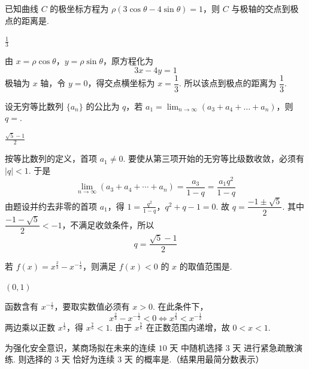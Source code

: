 \begin{problem}
已知曲线 \(C\) 的极坐标方程为 \( \rho(3\cos\theta-4\sin\theta)=1 \)，则 \(C\) 与极轴的交点到极点的距离是\fillinblank{}.
\end{problem}

\begin{answer}
\(\frac{1}{3}\)
\end{answer}

\begin{solution}
由 \(x=\rho\cos\theta\)，\(y=\rho\sin\theta\)，原方程化为
\[
3x-4y=1
\]
极轴为 \(x\) 轴，令 \(y=0\)，得交点横坐标为 \(x=\dfrac13\). 所以该点到极点的距离为 \(\dfrac13\).
\end{solution}

\begin{problem}
设无穷等比数列 \(\{a_{n}\}\) 的公比为 \(q\)，若 \(a_{1} = \displaystyle\lim_{n\to \infty}(a_{3} + a_{4} + \dots + a_{n})\)，则 \(q =\)\fillinblank{}.
\end{problem}

\begin{answer}
\(\frac{\sqrt{5}-1}{2}\)
\end{answer}

\begin{solution}
按等比数列的定义，首项 \(a_1\neq0\). 要使从第三项开始的无穷等比级数收敛，必须有 \(\lvert q\rvert<1\). 于是
\[
\lim_{n\to\infty}(a_3+a_4+\cdots+a_n)
=\frac{a_3}{1-q}=\frac{a_1q^2}{1-q}
\]
由题设并约去非零的首项 \(a_1\)，得
\(1=\frac{q^2}{1-q}\)，\(q^2+q-1=0\).
故 \(q=\dfrac{-1\pm\sqrt5}{2}\). 其中 \(\dfrac{-1-\sqrt5}{2}<-1\)，不满足收敛条件，所以
\[
q=\frac{\sqrt5-1}{2}
\]
\end{solution}

\begin{problem}
若 \( f(x) = x^{\frac{2}{3}} - x^{-\frac{1}{2}} \)，则满足 \( f(x) < 0 \) 的 \( x \) 的取值范围是\fillinblank{}.
\end{problem}

\begin{answer}
\((0,1)\)
\end{answer}

\begin{solution}
函数含有 \(x^{-\frac{1}{2}}\)，要取实数值必须有 \(x>0\). 在此条件下，
\[
x^{\frac23}-x^{-\frac12}<0
\iff x^{\frac23}<x^{-\frac12}
\]
两边乘以正数 \(x^{\frac{1}{2}}\)，得 \(x^{\frac{7}{6}}<1\). 由于 \(x^{\frac{7}{6}}\) 在正数范围内递增，故 \(0<x<1\).
\end{solution}

\begin{problem}
为强化安全意识，某商场拟在未来的连续 \(10\text{ 天}\) 中随机选择 \(3\text{ 天}\) 进行紧急疏散演练. 则选择的 \(3\text{ 天}\) 恰好为连续 \(3\text{ 天}\) 的概率是\fillinblank{}.（结果用最简分数表示）
\end{problem}

